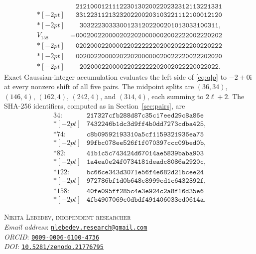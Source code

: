 \documentclass[11pt]{article}
\newcommand{\ii}{\mathrm{i}}
\begin{document}
\begin{align*}
      &\phantom{{}={}}\texttt{2121000121112230130200220232312113221331}\\*[-2pt]
      &\phantom{{}={}}\texttt{3312231121323202200203103221112100012120}\\*[-2pt]
      &\phantom{{}={}}\texttt{30322230333001231202200201013033100311},\\
V_{158}&=\texttt{0002002200002022020000002002222002220202}\\*[-2pt]
      &\phantom{{}={}}\texttt{0202000220000220222222020020222200220222}\\*[-2pt]
      &\phantom{{}={}}\texttt{0020022000020220200000020022220022202020}\\*[-2pt]
      &\phantom{{}={}}\texttt{20200022000022022222202002022220022022}.
\end{align*}
Exact Gaussian-integer accumulation evaluates the left side of \eqref{eq:qlp}
to $-2+0\ii$ at every nonzero shift of all five pairs.  The midpoint splits
are $(36,34)$, $(146,4)$, $(162,4)$, $(242,4)$, and $(314,4)$, each summing to
$2\ell+2$.  The SHA-256 identifiers, computed as in Section~\ref{sec:pairs},
are
\begin{align*}
34:\;&\texttt{217327cfb288d87c35c17eed29c8a86e}\\*[-2pt]
    &\texttt{7432246b1dc3d9ff4b0dd7273cdba425},\\*
74:\;&\texttt{c8b09592193310a5cf1159321936ea75}\\*[-2pt]
    &\texttt{99fbc078ee526f1f070397ccc09bed0b},\\*
82:\;&\texttt{41b1c5c743424d67014ae5839baba903}\\*[-2pt]
    &\texttt{1a4ea0e24f0734181deadc8086a2920c},\\*
122:\;&\texttt{bc66ce343d3071e56f4e682d21bcee24}\\*[-2pt]
    &\texttt{972786bf1d0b648c8999cd1c6432392f},\\*
158:\;&\texttt{40fe095ff285c4e3e924c2a8f16d35e6}\\*[-2pt]
    &\texttt{4fb4907069c0dbdf491406033ed0614a}.
\end{align*}




\bigskip
\noindent\textsc{Nikita Lebedev, independent researcher}\\
\textit{Email address}:
  \href{mailto:nlebedev.research@gmail.com}{\texttt{nlebedev.research@gmail.com}}\\
\textit{ORCID}:
  \href{https://orcid.org/0009-0006-6100-4736}{\texttt{0009-0006-6100-4736}}\\
\textit{DOI}:
  \href{https://doi.org/10.5281/zenodo.21776795}{\texttt{10.5281/zenodo.21776795}}
\end{document}
